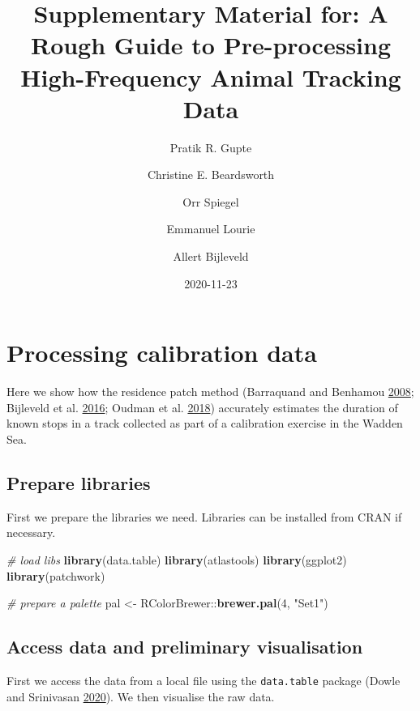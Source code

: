 \documentclass[
]{scrartcl}
\title{Supplementary Material for: A Rough Guide to Pre-processing High-Frequency Animal Tracking Data}
\author{Pratik R. Gupte \and Christine E. Beardsworth \and Orr Spiegel \and Emmanuel Lourie \and Allert Bijleveld}
\date{2020-11-23}
\newenvironment{Shaded}{}{}
\newcommand{\CommentTok}[1]{\textcolor[rgb]{0.38,0.63,0.69}{\textit{#1}}}
\newcommand{\DecValTok}[1]{\textcolor[rgb]{0.25,0.63,0.44}{#1}}
\newcommand{\KeywordTok}[1]{\textcolor[rgb]{0.00,0.44,0.13}{\textbf{#1}}}
\newcommand{\NormalTok}[1]{#1}
\newcommand{\OperatorTok}[1]{\textcolor[rgb]{0.40,0.40,0.40}{#1}}
\newcommand{\StringTok}[1]{\textcolor[rgb]{0.25,0.44,0.63}{#1}}
\begin{document}
\maketitle

{
\setcounter{tocdepth}{2}
\tableofcontents
}
\hypertarget{processing-calibration-data}{%
\section{Processing calibration data}\label{processing-calibration-data}}

Here we show how the residence patch method (Barraquand and Benhamou \protect\hyperlink{ref-barraquand2008}{2008}; Bijleveld et al. \protect\hyperlink{ref-bijleveld2016}{2016}; Oudman et al. \protect\hyperlink{ref-oudman2018}{2018}) accurately estimates the duration of known stops in a track collected as part of a calibration exercise in the Wadden Sea.

\hypertarget{prepare-libraries}{%
\subsection{Prepare libraries}\label{prepare-libraries}}

First we prepare the libraries we need. Libraries can be installed from CRAN if necessary.

\begin{Shaded}
\begin{Highlighting}[]
\CommentTok{\# load libs}
\KeywordTok{library}\NormalTok{(data.table)}
\KeywordTok{library}\NormalTok{(atlastools)}
\KeywordTok{library}\NormalTok{(ggplot2)}
\KeywordTok{library}\NormalTok{(patchwork)}

\CommentTok{\# prepare a palette}
\NormalTok{pal <{-}}\StringTok{ }\NormalTok{RColorBrewer}\OperatorTok{::}\KeywordTok{brewer.pal}\NormalTok{(}\DecValTok{4}\NormalTok{, }\StringTok{"Set1"}\NormalTok{)}
\end{Highlighting}
\end{Shaded}

\hypertarget{access-data-and-preliminary-visualisation}{%
\subsection{Access data and preliminary visualisation}\label{access-data-and-preliminary-visualisation}}

First we access the data from a local file using the \texttt{data.table} package (Dowle and Srinivasan \protect\hyperlink{ref-dowle2020}{2020}).
We then visualise the raw data.
\end{document}
